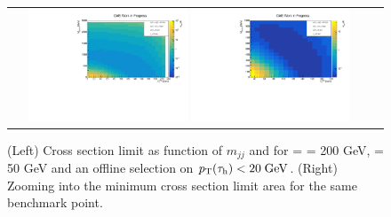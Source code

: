 \begin{figure}[tbh!]
	\centering
	\begin{tabular}{cc}
		\includegraphics[width=0.45\textwidth]{analysis/pics/JetInvMass_vs_MET_xsec_chi200_lsp050_taupt20.pdf}
		\includegraphics[width=0.45\textwidth]{analysis/pics/JetInvMass_vs_MET_xsec_chi200_lsp050_taupt20_zoom.pdf}
	\end{tabular}
	\caption{(Left) Cross section limit as function of $m_{jj}$ and \met for \charginopm = \neutralinotwo = 200 GeV, \neutralinoone = 50 GeV and an offline selection on $p_{\text{T}}(\tau_{\text{h}}) <  20\;\text{Ge}\kern-0.06667em\text{V}$. (Right) Zooming into the minimum cross section limit area for the same benchmark point.}
	\label{fig::JetInvMass_vs_MET_xsec_chi200_lsp050_taupt20}
\end{figure}

